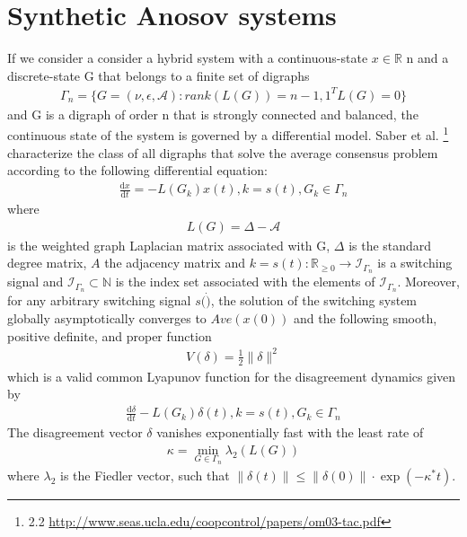 \documentclass{article}
\begin{document}
\section{Synthetic Anosov systems}
If we consider a consider a hybrid system with a continuous-state $x \in \mathbb{R}$ n 
and a discrete-state G that belongs to a finite set of digraphs 
\begin{equation} \label{eq1}
\begin{split}
\Gamma_n = \{G= (\nu, \epsilon, \mathcal{A}): rank(L(G)) = n-1, 1^{T}L(G)=0 \}
\end{split}
\end{equation}
and G is a digraph of order n that is strongly connected and balanced, the continuous state of the system is governed by a differential model. Saber et al. \footnote{2.2 \url{http://www.seas.ucla.edu/coopcontrol/papers/om03-tac.pdf}} characterize the class of all digraphs that solve the average consensus problem according to the following differential equation:
\begin{equation} \label{eq1}
\begin{split}
\frac{{\mathrm d}x}{{\mathrm d}t} = -L(G_k)x(t), k = s(t), G_k \in \Gamma_n
\end{split}
\end{equation}
where
\begin{equation} \label{eq1}
\begin{split}
L(G) = \Delta - \mathcal{A}
\end{split}
\end{equation}
is the weighted graph Laplacian matrix associated with G, $\Delta$ is the standard degree matrix, $A$ the adjacency matrix and $k = s(t): \mathbb{R}_{\geq 0} \rightarrow \mathcal{I}_{\Gamma_n}$ is a switching signal and $\mathcal{I}_{\Gamma_n} \subset \mathbb{N}$ is the index set associated with the elements of $\mathcal{I}_{\Gamma_n}$. Moreover, for any arbitrary switching signal $s(\dot)$, the solution of the switching system globally asymptotically converges to $Ave(x(0))$ and the following smooth, positive definite, and proper function
\begin{equation} \label{eq1}
\begin{split}
V(\delta) = \tfrac{1}{2}  \lVert \delta \rVert^2
\end{split}
\end{equation}
which is a valid common Lyapunov function for the disagreement dynamics given by
\begin{equation} \label{eq1}
\begin{split}
\frac{{\mathrm d}\delta}{{\mathrm d}t} - L(G_k)\delta(t), k = s(t), G_k \in \Gamma_n
\end{split}
\end{equation}
The disagreement vector $\delta$ vanishes exponentially fast with the least rate of 
\begin{equation} \label{eq1}
\begin{split}
\kappa = \min_{G \in \Gamma_n}\lambda_2(L(G))
\end{split}
\end{equation}
where $\lambda_2$ is the Fiedler vector, such that $\lVert \delta(t) \rVert \leq \lVert \delta(0) \rVert\cdot\exp(-\kappa^* t)$.
\end{document}
